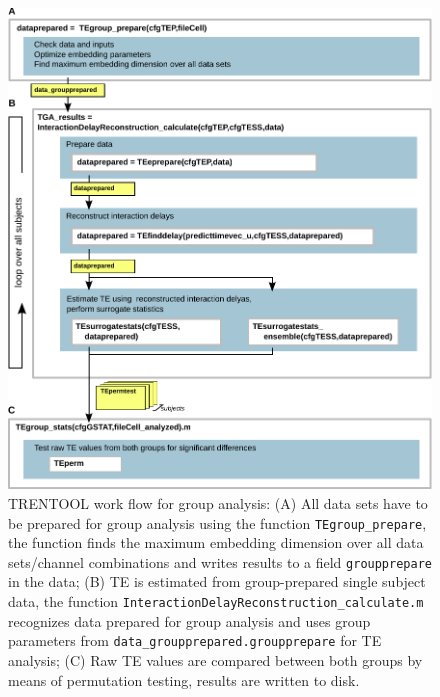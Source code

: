 \documentclass[a4paper,10pt]{article}
\begin{document}
\begin{figure}[H]	
	\centering	
 		\includegraphics[scale=0.90]{figures/TRENTOOL3_groupanalysis.pdf}
	\caption[TRENTOOL work flow for group analysis]{TRENTOOL work flow for group analysis: 
	(A) All data sets have to be prepared for group analysis using the function \texttt{TEgroup\_prepare}, the function finds the maximum embedding dimension over all data sets/channel combinations and writes results to a field \texttt{groupprepare} in the data;
	(B) TE is estimated from group-prepared single subject data, the function  \texttt{InteractionDelayReconstruction\_calculate.m} recognizes data prepared for group analysis and uses group parameters from \texttt{data\_groupprepared.groupprepare} for TE analysis;
	(C) Raw TE values are compared between both groups by means of permutation testing, results are written to disk.
	}
	\label{fig:groupanalysis}
\end{figure} 
\end{document}
